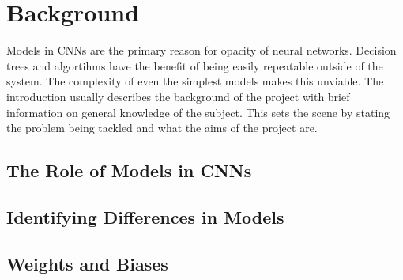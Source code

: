 \section{Background}

Models in CNNs are the primary reason for opacity of neural networks. Decision
trees and algortihms have the benefit of being easily repeatable outside of the
system. The complexity of even the simplest models makes this unviable. 
The introduction usually describes the background of the project with brief information on general knowledge of the subject. This sets the scene by stating the problem being tackled and what the aims of the project are.

\subsection{The Role of Models in CNNs}
\subsection{Identifying Differences in Models}
\subsection{Weights and Biases}
\subsection{}
\subsection{}
\subsection{}
\subsection{}
